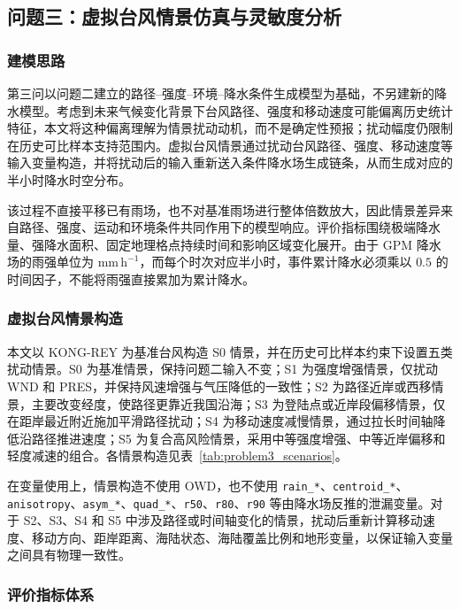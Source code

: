 \subsection{问题三：虚拟台风情景仿真与灵敏度分析}

\subsubsection{建模思路}

第三问以问题二建立的路径--强度--环境--降水条件生成模型为基础，不另建新的降水模型。考虑到未来气候变化背景下台风路径、强度和移动速度可能偏离历史统计特征，本文将这种偏离理解为情景扰动动机，而不是确定性预报；扰动幅度仍限制在历史可比样本支持范围内。虚拟台风情景通过扰动台风路径、强度、移动速度等输入变量构造，并将扰动后的输入重新送入条件降水场生成链条，从而生成对应的半小时降水时空分布。

该过程不直接平移已有雨场，也不对基准雨场进行整体倍数放大，因此情景差异来自路径、强度、运动和环境条件共同作用下的模型响应。评价指标围绕极端降水量、强降水面积、固定地理格点持续时间和影响区域变化展开。由于 GPM 降水场的雨强单位为 $\mathrm{mm\,h^{-1}}$，而每个时次对应半小时，事件累计降水必须乘以 $0.5$ 的时间因子，不能将雨强直接累加为累计降水。

\subsubsection{虚拟台风情景构造}

本文以 KONG-REY 为基准台风构造 S0 情景，并在历史可比样本约束下设置五类扰动情景。S0 为基准情景，保持问题二输入不变；S1 为强度增强情景，仅扰动 WND 和 PRES，并保持风速增强与气压降低的一致性；S2 为路径近岸或西移情景，主要改变经度，使路径更靠近我国沿海；S3 为登陆点或近岸段偏移情景，仅在距岸最近附近施加平滑路径扰动；S4 为移动速度减慢情景，通过拉长时间轴降低沿路径推进速度；S5 为复合高风险情景，采用中等强度增强、中等近岸偏移和轻度减速的组合。各情景构造见表~\ref{tab:problem3_scenarios}。

在变量使用上，情景构造不使用 OWD，也不使用 \verb|rain_*|、\verb|centroid_*|、\verb|anisotropy|、\verb|asym_*|、\verb|quad_*|、\verb|r50|、\verb|r80|、\verb|r90| 等由降水场反推的泄漏变量。对于 S2、S3、S4 和 S5 中涉及路径或时间轴变化的情景，扰动后重新计算移动速度、移动方向、距岸距离、海陆状态、海陆覆盖比例和地形变量，以保证输入变量之间具有物理一致性。

\subsubsection{评价指标体系}


